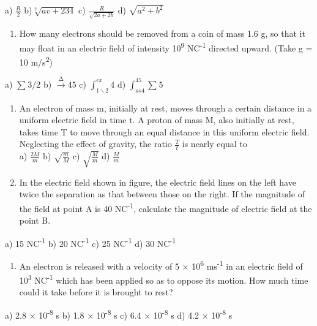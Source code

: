 a) \(\frac{R}{2}\) b)\(\sqrt[2]{av + 234}\) c)
\(\frac{R}{\sqrt{2a + 2b}}\) d) \(\sqrt{a^{2} + b^{2}}\)

\begin{enumerate}
\def\labelenumi{\arabic{enumi}.}
\setcounter{enumi}{20}
\item
  How many electrons should be removed from a coin of mass 1.6 g, so
  that it may float in an electric field of intensity
  10\textsuperscript{9} NC\textsuperscript{-1} directed upward. (Take g
  = 10 m/s\textsuperscript{2})
\end{enumerate}

a) \(\sum_{}^{}{3/2}\) b) \(\overset{\mathrm{\Delta}}{\rightarrow}45\)
c) \(\int_{1\backslash 2}^{ex}4\) d) \(\int_{as4}^{45}{\sum_{}^{}5}\)

\begin{enumerate}
\def\labelenumi{\arabic{enumi}.}
\setcounter{enumi}{21}
\item
  An electron of mass m, initially at rest, moves through a certain
  distance in a uniform electric field in time t. A proton of mass M,
  also initially at rest, takes time T to move through an equal distance
  in this uniform electric field. Neglecting the effect of gravity, the
  ratio \(\frac{T}{t}\) is nearly equal to\\
  a) \(\frac{2M}{m}\) b) \(\sqrt{\frac{m}{M}}\) c)
  \(\sqrt{\frac{M}{m}}\) d) \(\frac{M}{m}\)
\item
  In the electric field shown in figure, the electric field lines on the
  left have twice the separation as that between those on the right. If
  the magnitude of the field at point A is 40 NC\textsuperscript{-1},
  calculate the magnitude of electric field at the point B.
\end{enumerate}

a) 15 NC\textsuperscript{-1} b) 20 NC\textsuperscript{-1} c) 25
NC\textsuperscript{-1} d) 30 NC\textsuperscript{-1}

\begin{enumerate}
\def\labelenumi{\arabic{enumi}.}
\setcounter{enumi}{23}
\item
  An electron is released with a velocity of 5 × 10\textsuperscript{6}
  ms\textsuperscript{-1} in an electric field of 10\textsuperscript{3}
  NC\textsuperscript{-1} which has been applied so as to oppose its
  motion. How much time could it take before it is brought to rest?
\end{enumerate}

a) 2.8 × 10\textsuperscript{-8} s b) 1.8 × 10\textsuperscript{-8} s c)
6.4 × 10\textsuperscript{-8} s d) 4.2 × 10\textsuperscript{-8} s

